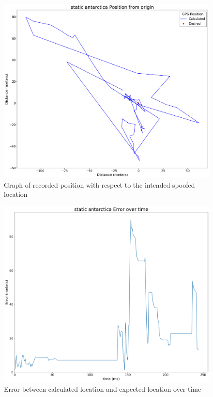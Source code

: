 \begin{figure}[H]
    \begin{centering}
        \includegraphics[width=12cm,keepaspectratio]{Figures/2021_3_30_static_antarctica Position from origin.png}
        \caption{Graph of recorded position with respect to the intended spoofed location}
        \label{fig:antarcticaStaticPosition}
    \end{centering}
\end{figure}

\begin{figure}[H]
    \begin{centering}
        \includegraphics[width=12cm,keepaspectratio]{Figures/2021_3_30_static_antarctica error over time.png}
        \caption{Error between calculated location and expected location over time}
        \label{fig:antarcticaStaticError}
    \end{centering}
\end{figure}

